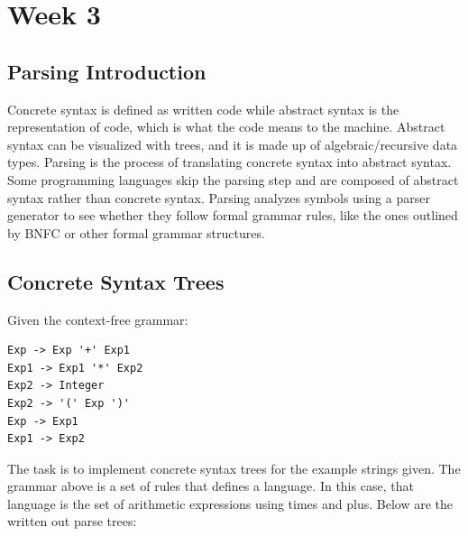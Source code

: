 \documentclass{article}
\theoremstyle{theorem}
\theoremstyle{definition}
\theoremstyle{remark}
\begin{document}
\section{Week 3}

\subsection{Parsing Introduction}

Concrete syntax is defined as written code while abstract syntax is the representation of code, which is what the code means to the machine. Abstract syntax can be visualized with trees, and it is made up of algebraic/recursive data types. Parsing is the process of translating concrete syntax into abstract syntax. Some programming languages skip the parsing step and are composed of abstract syntax rather than concrete syntax. Parsing analyzes symbols using a parser generator to see whether they follow formal grammar rules, like the ones outlined by BNFC or other formal grammar structures. 

\subsection{Concrete Syntax Trees}

Given the context-free grammar: 

\begin{lstlisting}
Exp -> Exp '+' Exp1 
Exp1 -> Exp1 '*' Exp2              
Exp2 -> Integer            
Exp2 -> '(' Exp ')'  
Exp -> Exp1             
Exp1 -> Exp2 
\end{lstlisting}

The task is to implement concrete syntax trees for the example strings given. The grammar above is a set of rules that defines a language. In this case, that language is the set of arithmetic expressions using times and plus. Below are the written out parse trees:
\end{document}
